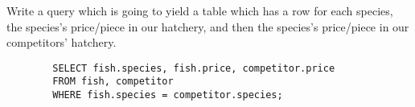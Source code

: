 \begin{blocksection}
Write a query which is going to yield a table which has a row for each species, the species's price/piece in our hatchery, and then the species's price/piece in our competitors' hatchery.

\begin{solution}
    \begin{lstlisting}
        SELECT fish.species, fish.price, competitor.price
        FROM fish, competitor
        WHERE fish.species = competitor.species;
    \end{lstlisting}
\end{solution}
\end{blocksection}
